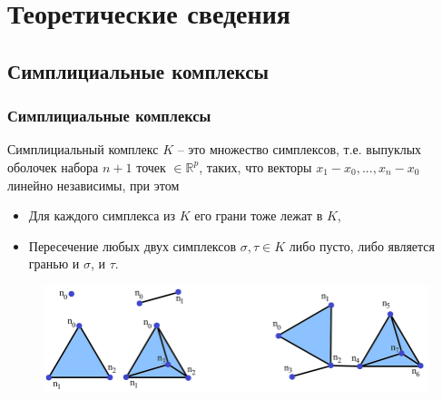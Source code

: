 \documentclass{beamer}
\begin{document}
	\section{Теоретические сведения}
		\subsection{Симплициальные комплексы}
		\begin{frame}
			\frametitle{Симплициальные комплексы}
			
			\begin{definition}
				Симплициальный комплекс $K$ -- это множество симплексов, т.е. выпуклых оболочек набора $n+1$ точек $\in \mathbb{R}^p$, таких, что векторы $ x_1 - x_0, ..., x_n - x_0 $ линейно независимы, при этом
				\begin{itemize}
					\setlength{\itemsep}{-1mm}
					\item Для каждого симплекса из $K$ его грани тоже лежат в $K$,
					\item Пересечение любых двух симплексов $\sigma, \tau \in K$ либо пусто, либо является гранью и $\sigma$, и $\tau$.
				\end{itemize}
			\end{definition}
			\begin{figure}
				\centering
				\includegraphics[width=\linewidth]{simplexAndComplex.png}
			\end{figure}
		\end{frame}

\end{document}

